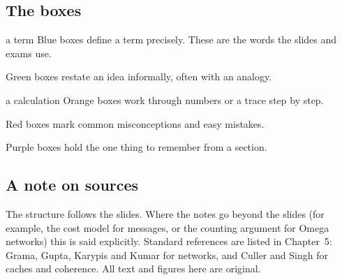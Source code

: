 \documentclass[11pt,a4paper,openany]{book}
\begin{document}
\subsection*{The boxes}
\begin{definition}{a term}
Blue boxes define a term precisely. These are the words the slides and exams use.
\end{definition}
\begin{intuition}
Green boxes restate an idea informally, often with an analogy.
\end{intuition}
\begin{workedex}{a calculation}
Orange boxes work through numbers or a trace step by step.
\end{workedex}
\begin{pitfall}
Red boxes mark common misconceptions and easy mistakes.
\end{pitfall}
\begin{keyidea}
Purple boxes hold the one thing to remember from a section.
\end{keyidea}

\subsection*{A note on sources}
The structure follows the slides. Where the notes go beyond the slides (for example, the cost
model for messages, or the counting argument for Omega networks) this is said explicitly. Standard
references are listed in Chapter~5: Grama, Gupta, Karypis and Kumar for networks, and Culler and
Singh for caches and coherence. All text and figures here are original.

\tableofcontents

\mainmatter











\appendix

\end{document}
